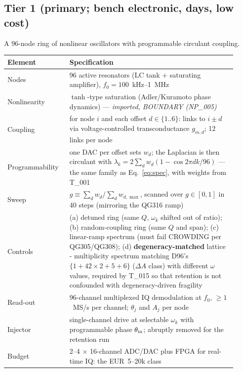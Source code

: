 \documentclass[11pt,a4paper]{article}
\newcommand{\ls}[1]{\ensuremath{\lambda_{#1}}}
\newcommand{\w}[1]{\ensuremath{\omega_{#1}}}
\begin{document}
\subsection{Tier 1 (primary; bench electronic, days, low cost)}
A 96-node ring of nonlinear oscillators with programmable circulant coupling.

\begin{table}[h]
\centering
\small
\begin{tabular}{@{}p{0.24\linewidth}p{0.68\linewidth}@{}}
\toprule
Element & Specification \\
\midrule
Nodes & 96 active resonators (LC tank $+$ saturating amplifier), $f_0=100$~kHz--1~MHz \\
Nonlinearity & $\tanh$-type saturation (Adler/Kuramoto phase dynamics) --- \emph{imported, BOUNDARY
(NP\_005)} \\
Coupling & for node $i$ and each offset $d\in\{1..6\}$: links to $i\pm d$ via voltage-controlled
transconductance $g_{m,d}$; 12 links per node \\
Programmability & one DAC per offset sets $w_d$; the Laplacian is then circulant with
$\ls{k}=2\sum_d w_d(1-\cos 2\pi dk/96)$ --- the same family as Eq.~\eqref{eq:spec}, with weights
from T\_001 \\
Sweep & $g\equiv\sum_d w_d / \sum_d w_{d,\max}$, scanned over $g\in[0,1]$ in 40 steps (mirroring the
QG316 ramp) \\
Controls & (a) detuned ring (same $Q$, $\w{k}$ shifted out of ratio); (b) random-coupling ring (same
$Q$ and span); (c) linear-ramp spectrum (must fail CROWDING per QG305/QG308); (d)
\textbf{degeneracy-matched} lattice - multiplicity spectrum matching D96's
$\{1+42\times2+5+6\}$ ($\Delta A$ class) with different $\w{}$ values, required by T\_015 so that
retention is not confounded with degeneracy-driven fragility \\
Read-out & 96-channel multiplexed IQ demodulation at $f_0$, $\ge1$~MS/s per channel; $\theta_j$ and
$A_j$ per node \\
Injector & single-channel drive at selectable $\w{k}$ with programmable phase $\theta_{\rm in}$;
abruptly removed for the retention run \\
Budget & 2--4 $\times$ 16-channel ADC/DAC plus FPGA for real-time IQ: the EUR~5--20k class \\
\bottomrule
\end{tabular}
\end{table}
\end{document}
